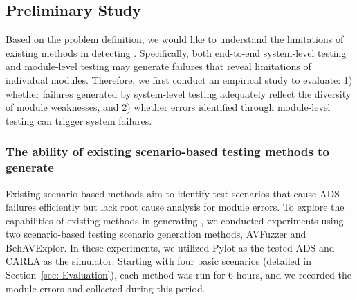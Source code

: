 \subsection{Preliminary Study}\label{sec: perliminary_study}

Based on the problem definition, we would like to understand the limitations of existing methods in detecting \mccs. Specifically, both end-to-end system-level testing and module-level testing may generate failures that reveal limitations of individual modules. Therefore, we first conduct an empirical study to evaluate: 1) whether failures generated by system-level testing adequately reflect the diversity of module weaknesses, and 2) whether errors identified through module-level testing can trigger system failures.

\subsubsection{The ability of existing scenario-based testing methods to generate \mccs}\label{sec:perliminary_exist_mccs}


\begin{table}[]
    \centering
    \caption{Module Failures and Collision Distributions of Exising Methods}
    \vspace{-10pt}
    \vspace{-10pt}
    \label{tab: preliminary_module}
\end{table}

Existing scenario-based methods aim to identify test scenarios that cause ADS failures efficiently but lack root cause analysis for module errors. To explore the capabilities of existing methods in generating \mccs, we conducted experiments using two scenario-based testing scenario generation methods, AVFuzzer\cite{li2020av} and BehAVExplor\cite{cheng2023behavexplor}. In these experiments, we utilized Pylot\cite{gog2021pylot} as the tested ADS and CARLA as the simulator. Starting with four basic scenarios (detailed in Section~\ref{sec: Evaluation}), each method was run for 6 hours, and we recorded the module errors and \mccs collected during this period.

